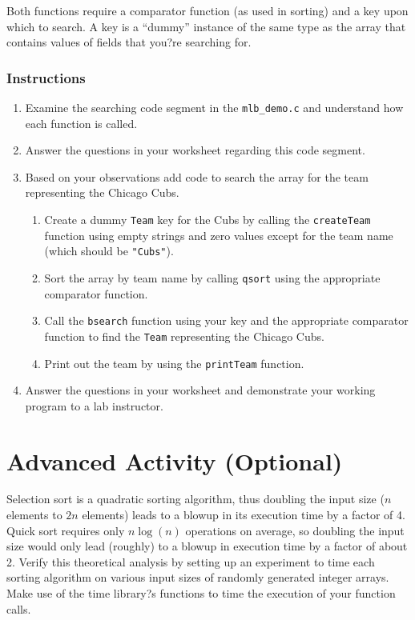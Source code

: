 \documentclass[12pt]{scrartcl}
\begin{document}
Both functions require a comparator function (as used in sorting) and a 
key upon which to search.  A key is a ``dummy'' instance of the same type 
as the array that contains values of fields that you?re searching for.

\subsubsection*{Instructions}

\begin{enumerate}
  \item Examine the searching code segment in the \texttt{mlb_demo.c} 
	and understand how each function is called.  
  \item Answer the questions in your worksheet regarding this code segment.
  \item Based on your observations add code to search the array for the 
	team representing the Chicago Cubs.
  \begin{enumerate}
    \item Create a dummy \texttt{Team} key for the Cubs by 
    calling the \texttt{createTeam} function using empty strings and 
    zero values except for the team name (which should be \texttt{"Cubs"}).
    \item Sort the array by team name by calling \texttt{qsort} using 
    the appropriate comparator function.
    \item Call the \texttt{bsearch} function using your key and the 
    appropriate comparator function to find the \texttt{Team} representing 
    the Chicago Cubs.
    \item Print out the team by using the \texttt{printTeam} function.
  \end{enumerate}
  \item Answer the questions in your worksheet and demonstrate your 
    working program to a lab instructor.
\end{enumerate}

\section{Advanced Activity (Optional)}

Selection sort is a quadratic sorting algorithm, thus doubling the input size 
($n$ elements to $2n$ elements) leads to a blowup in its execution time 
by a factor of 4.  Quick sort requires only $n\log(n)$ operations on average, 
so doubling the input size would only lead (roughly) to a blowup in execution 
time by a factor of about 2.  Verify this theoretical analysis by setting up an 
experiment to time each sorting algorithm on various input sizes of randomly 
generated integer arrays.  Make use of the time library?s functions to time 
the execution of your function calls.  
	
\end{document}
